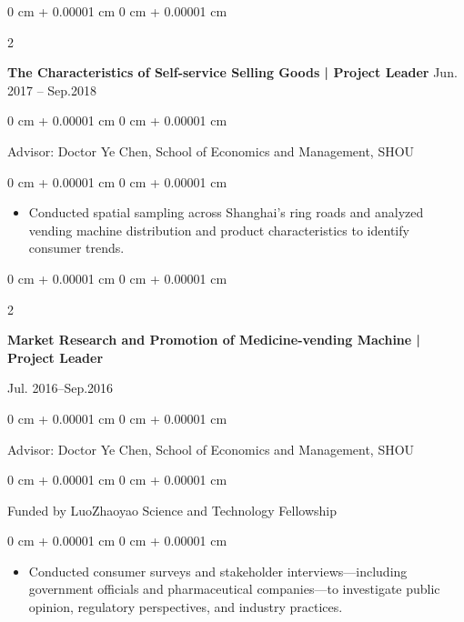 \documentclass[10pt, letterpaper]{article}
\newenvironment{highlights}{
    \begin{itemize}[
        topsep=0.10 cm,
        parsep=0.10 cm,
        partopsep=0pt,
        itemsep=0pt,
        leftmargin=0 cm + 10pt
    ]
}{
    \end{itemize}
} %
\newenvironment{onecolentry}{
    \begin{adjustwidth}{
        0 cm + 0.00001 cm
    }{
        0 cm + 0.00001 cm
    }
}{
    \end{adjustwidth}
} %
\newenvironment{twocolentry}[2][]{
    \onecolentry
    \def\secondColumn{#2}
    \setcolumnwidth{\fill, 4.5 cm}
    \begin{paracol}{2}
}{
    \switchcolumn \raggedleft \secondColumn
    \end{paracol}
    \endonecolentry
} %
\newenvironment{header}{
    \setlength{\topsep}{0pt}\par\kern\topsep\centering\linespread{1}
}{
    \par\kern\topsep
} %
\begin{document}
\begin{header}
\begin{comment}
            \end{highlights}
        \end{onecolentry}
\end{comment}


        \vspace{0 cm}
    
     
          \begin{twocolentry}{
            Jun. 2017 – Sep.2018
        }
            \textbf{\textbf{The Characteristics of Self-service Selling Goods | Project Leader }
}\end{twocolentry}
\begin{onecolentry}
    Advisor: Doctor Ye Chen, School of Economics and Management, SHOU 

\end{onecolentry}
        \vspace{0 cm}
        \begin{onecolentry}
            \begin{highlights}
                \item Conducted spatial sampling across Shanghai’s ring roads and analyzed vending machine distribution and product characteristics to identify consumer trends.

            \end{highlights}
        \end{onecolentry}


        \vspace{0 cm}

        \begin{twocolentry}
        {Jul. 2016–Sep.2016 }
            \textbf{Market Research and Promotion of Medicine-vending Machine | Project Leader }

        \end{twocolentry}
        \begin{onecolentry}
            Advisor: Doctor Ye Chen, School of Economics and Management, SHOU \end{onecolentry}
        \begin{onecolentry}
            Funded by LuoZhaoyao Science and Technology Fellowship 

        \end{onecolentry}
        \vspace{0 cm}
       

        \begin{onecolentry}
            \begin{highlights}
                \item Conducted consumer surveys and stakeholder interviews—including government officials and pharmaceutical companies—to investigate public opinion, regulatory perspectives, and industry practices.
            \end{highlights}
        \end{onecolentry}



\end{header}
\end{document}
